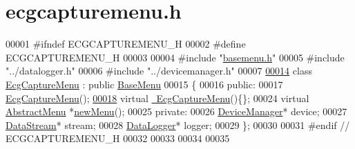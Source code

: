 \hypertarget{ecgcapturemenu_8h_source}{}\section{ecgcapturemenu.\+h}
\label{ecgcapturemenu_8h_source}

\begin{DoxyCode}
00001 \textcolor{preprocessor}{#ifndef ECGCAPTUREMENU\_H}
00002 \textcolor{preprocessor}{#define ECGCAPTUREMENU\_H}
00003 
00004 \textcolor{preprocessor}{#include "\hyperlink{basemenu_8h}{basemenu.h}"}
00005 \textcolor{preprocessor}{#include "../datalogger.h"}
00006 \textcolor{preprocessor}{#include "../devicemanager.h"}
00007 
\hypertarget{ecgcapturemenu_8h_source.tex_l00014}{}\hyperlink{classEcgCaptureMenu}{00014} \textcolor{keyword}{class }\hyperlink{classEcgCaptureMenu}{EcgCaptureMenu} : \textcolor{keyword}{public} \hyperlink{classBaseMenu}{BaseMenu}
00015 \{
00016 \textcolor{keyword}{public}:
00017     \hyperlink{classEcgCaptureMenu_ac430bc0a2eb1879fe77cd0133d4dd704}{EcgCaptureMenu}();
\hypertarget{ecgcapturemenu_8h_source.tex_l00018}{}\hyperlink{classEcgCaptureMenu_ac779737a084cb49d1517974543d4965b}{00018}     \textcolor{keyword}{virtual} \hyperlink{classEcgCaptureMenu_ac779737a084cb49d1517974543d4965b}{~EcgCaptureMenu}()\{\};
00024     \textcolor{keyword}{virtual} \hyperlink{classAbstractMenu}{AbstractMenu} *\hyperlink{classEcgCaptureMenu_a610d2985e09cd56cb381e6e443dbbc72}{newMenu}();
00025 \textcolor{keyword}{private}:
00026        \hyperlink{classDeviceManager}{DeviceManager}* device;
00027        \hyperlink{classDataStream}{DataStream}* stream;
00028        \hyperlink{classDataLogger}{DataLogger}* logger;
00029 \};
00030 
00031 \textcolor{preprocessor}{#endif // ECGCAPTUREMENU\_H}
00032 
00033 
00034 
00035 
\end{DoxyCode}
